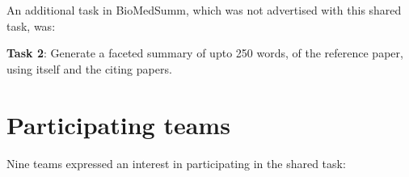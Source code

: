 \documentclass[11pt]{article}
\begin{document}
An additional task in BioMedSumm, which was not advertised with this shared task, was:

{\bf Task 2}: Generate a faceted summary of upto 250 words, of the 
reference paper, using itself and the citing papers.


\section{Participating teams}
Nine teams expressed an interest in participating in the shared task:
\end{document}
